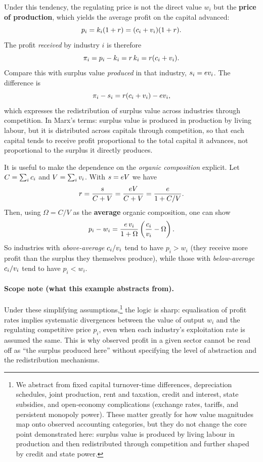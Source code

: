 Under this tendency, the regulating price is not the direct value $w_i$ but the
\textbf{price of production}, which yields the average profit on the capital advanced:
\begin{equation}
  p_i = k_i(1+r) = (c_i + v_i)(1+r).
  \label{eq:price-of-production}
\end{equation}
The profit \emph{received} by industry $i$ is therefore
\[
  \pi_i = p_i - k_i = r\,k_i = r(c_i+v_i).
\]
Compare this with surplus value \emph{produced} in that industry, $s_i=ev_i$.
The difference is
\[
  \pi_i - s_i = r(c_i+v_i) - ev_i,
\]
which expresses the redistribution of surplus value across industries through competition.
In Marx's terms: surplus value is produced in production by living labour, but it is distributed across capitals through competition,
so that each capital tends to receive profit proportional to the total capital it advances, not proportional to the surplus it directly produces.

It is useful to make the dependence on the \emph{organic composition} explicit.
Let $C=\sum_i c_i$ and $V=\sum_i v_i$. With $s=e V$ we have
\[
  r = \frac{s}{C+V} = \frac{e V}{C+V}
  = \frac{e}{1 + C/V}.
\]
Then, using $\Omega = C/V$ as the \textbf{average} organic composition, one can show
\begin{equation}
\label{eq:pop-deviation}
p_i - w_i
=
\frac{e\,v_i}{1+\Omega}
\left(
  \frac{c_i}{v_i}-\Omega
\right).
\end{equation}
So industries with \emph{above-average} $c_i/v_i$ tend to have $p_i>w_i$
(they receive more profit than the surplus they themselves produce), while those with
\emph{below-average} $c_i/v_i$ tend to have $p_i<w_i$.

\paragraph{Scope note (what this example abstracts from).}
Under these simplifying assumptions,\footnote{We abstract from fixed capital turnover-time differences, depreciation schedules,
joint production, rent and taxation, credit and interest, state subsidies, and open-economy complications (exchange rates, tariffs,
and persistent monopoly power). These matter greatly for how value magnitudes map onto observed accounting categories, but they do
not change the core point demonstrated here: surplus value is produced by living labour in production and then redistributed through
competition and further shaped by credit and state power.}
the logic is sharp: equalisation of profit rates implies systematic divergences between the value of output $w_i$ and the regulating
competitive price $p_i$, even when each industry's exploitation rate is assumed the same. This is why observed profit in a given sector
cannot be read off as ``the surplus produced here'' without specifying the level of abstraction and the redistribution mechanisms.

